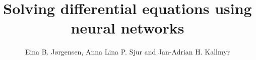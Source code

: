 \documentclass[a4paper, 11pt, twocolumn]{article}
\begin{document}
\title{Solving differential equations using neural networks}

\author{Eina B. Jørgensen, Anna Lina P. Sjur and Jan-Adrian H. Kallmyr}

\twocolumn[
  \begin{@twocolumnfalse}
    \maketitle
    
  \end{@twocolumnfalse}
]
















%
\end{document}
